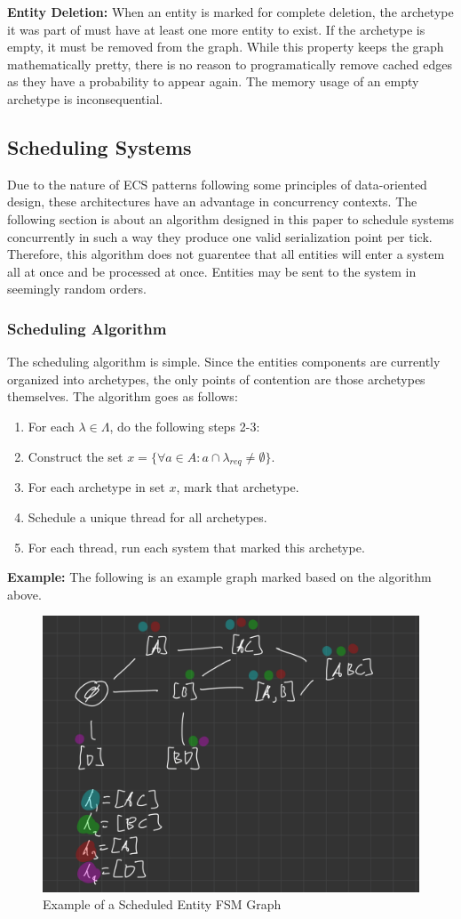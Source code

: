 \textbf{Entity Deletion: } When an entity is marked for complete deletion, the archetype it was part of must have at least one more entity to exist. If the archetype is empty, it must be removed from the graph. While this property keeps the graph mathematically pretty, there is no reason to programatically remove cached edges as they have a probability to appear again. The memory usage of an empty archetype is inconsequential. 

\subsection{Scheduling Systems}
\label{sec:scheduling}

Due to the nature of ECS patterns following some principles of data-oriented design, these architectures have an advantage in concurrency contexts. The following section is about an algorithm designed in this paper to schedule systems concurrently in such a way they produce one valid serialization point per tick. Therefore, this algorithm does not guarentee that all entities will enter a system all at once and be processed at once. Entities may be sent to the system in seemingly random orders. 

\subsubsection{Scheduling Algorithm}
The scheduling algorithm is simple. Since the entities components are currently organized into archetypes, the only points of contention are those archetypes themselves. The algorithm goes as follows:

\begin{enumerate}
    \item For each $\lambda \in \Lambda$, do the following steps 2-3:
    \item Construct the set $x = \{\forall a \in A : a \cap \lambda_{req} \not= \emptyset\}$.
    \item For each archetype in set $x$, mark that archetype.
    \item Schedule a unique thread for all archetypes.
    \item For each thread, run each system that marked this archetype.
\end{enumerate}

\textbf{Example:} The following is an example graph marked based on the algorithm above.

\begin{figure}[H]
    \centering
    \includegraphics[width=0.5\linewidth]{resources/graph2.png}
    \caption{Example of a Scheduled Entity FSM Graph}
    \label{fig:graph2}
\end{figure}

